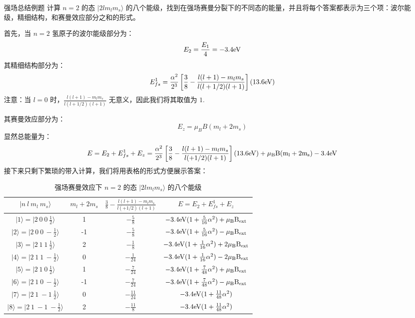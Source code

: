 \begin{example}{强场总结例题}
计算 $n=2$ 的态 $|2lm_lm_s\rangle$ 的八个能级，找到在强场赛曼分裂下的不同态的能量，并且将每个答案都表示为三个项：波尔能级，精细结构，和赛曼效应部分之和的形式。

首先，当 $n=2$ 氢原子的波尔能级部分为：
\begin{equation}
E_2=\frac{E_1}{4}=-3.4\rm{eV}
\end{equation}
其精细结构部分为：
\begin{equation}
E_{fs}^1=\frac{\alpha^2}{2^3}\left[\frac{3}{8}-\frac{l(l+1)-m_lm_s}{l(l+1/2)(l+1)}\right](13.6 \rm{eV})
\end{equation}
注意：当 $l=0$ 时，$\frac{l(l+1)-m_lm_s}{l(l+1/2)(l+1)}$ 无意义，因此我们将其取值为 $1$.

其赛曼效应部分为：
\begin{equation}
E_z =\mu_BB(m_l+2m_s)
\end{equation}
显然总能量为：
\begin{equation}
E=E_2+E_{fs}^1+E_z = \frac{\alpha^2}{2^3}\left[\frac{3}{8}-\frac{l(l+1)-m_lm_s}{l(+1/2)(l+1)}\right](13.6 \rm{eV})+\mu_BB(m_l+2m_s)-3.4 \rm{eV}
\end{equation}
接下来只剩下繁琐的带入计算，我们将用表格的形式方便展示答案：
\begin{table}[ht]
\centering
\caption{强场赛曼效应下 $n=2$ 的态 $|2lm_lm_s\rangle$ 的八个能级}\label{ZemEff_tab1}
\begin{tabular}{|c|c|c|c|}
\hline
$|n \ l \ m_l \ m_s\rangle$& $m_l+2m_s$ & $\frac{3}{8}-\frac{l(l+1)-m_lm_s}{l(+1/2)(l+1)}$ & $E=E_2+E_{fs}^1+E_z $ \\
\hline
$|1\rangle = |2\ 0 \ 0 \ \frac{1}{2}\rangle$ & 1 & $-\frac{5}{8}$ & $-3.4 \rm{eV}(1+\frac{5}{16}\alpha^2)+\mu_BB_{ext}$ \\
\hline
$|2\rangle = |2\ 0 \ 0 \ -\frac{1}{2}\rangle$ & -1 & $-\frac{5}{8}$ & $-3.4 \rm{eV}(1+\frac{5}{16}\alpha^2)-\mu_BB_{ext}$ \\
\hline
$|3\rangle = |2\ 1 \ 1 \ \frac{1}{2}\rangle$ & 2 & $-\frac{1}{8}$ & $-3.4 \rm{eV}(1+\frac{1}{16}\alpha^2)+2\mu_BB_{ext}$ \\
\hline
$|4\rangle = |2\ 1 \ 1 \ -\frac{1}{2}\rangle$ & 0 & $-\frac{1}{24}$ & $-3.4 \rm{eV}(1+\frac{1}{16}\alpha^2)-2\mu_BB_{ext}$ \\
\hline
$|5\rangle = |2\ 1 \ 0 \ \frac{1}{2}\rangle$ & 1 & $-\frac{7}{24}$ & $-3.4 \rm{eV}(1+\frac{7}{48}\alpha^2)+\mu_BB_{ext}$ \\
\hline
$|6\rangle = |2\ 1 \ 0 \ -\frac{1}{2}\rangle$ & -1 & $-\frac{7}{24}$ & $-3.4 \rm{eV}(1+\frac{7}{48}\alpha^2)-\mu_BB_{ext}$ \\
\hline
$|7\rangle = |2\ 1 \ -1 \ \frac{1}{2}\rangle$ & 0 & $-\frac{11}{24}$ & $-3.4 \rm{eV}(1+\frac{11}{48}\alpha^2)$ \\
\hline
$|8\rangle = |2\ 1 \ -1 \ -\frac{1}{2}\rangle$ & 2 & $-\frac{11}{8}$ & $-3.4 \rm{eV}(1+\frac{11}{48}\alpha^2)$ \\
\hline
\end{tabular}
\end{table}
\end{example}
